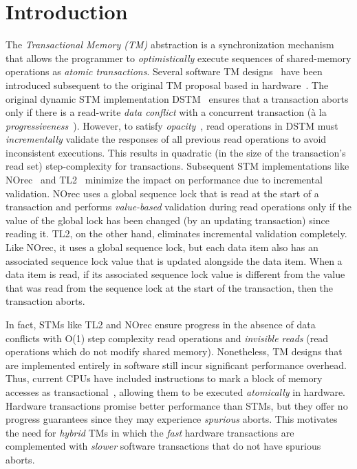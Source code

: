 \section{Introduction}
\label{sec:intro}
%
%
The \emph{Transactional Memory (TM)} abstraction is a synchronization mechanism 
that allows the programmer to \emph{optimistically} execute sequences of shared-memory
operations as \emph{atomic transactions}.
Several software TM designs~\cite{norec, ST95,HLM+03,fraser} have been introduced subsequent to the original TM proposal based in
hardware~\cite{HM93}. 
The original dynamic STM implementation DSTM~\cite{HLM+03} ensures that a transaction aborts only if there is a read-write \emph{data conflict} with a concurrent
transaction (\`a la \emph{progressiveness}~\cite{tm-book}). However, to satisfy \emph{opacity}~\cite{tm-book}, read operations in DSTM must \emph{incrementally} validate
the responses of all previous read operations to avoid inconsistent executions. 
This results in quadratic  (in the size of the transaction's read
set) step-complexity for transactions. Subsequent STM 
implementations like NOrec~\cite{norec} and TL2~\cite{DSS06}
minimize the impact on performance due to incremental validation.
NOrec uses a global sequence lock that is read at the start of a transaction and performs \emph{value-based}
validation during read operations only if the value of the global lock has been changed (by an updating transaction) 
since reading it.
TL2, on the other hand, eliminates incremental validation completely.
Like NOrec, it uses a global sequence lock, but each data item also 
has an associated sequence lock value that is updated alongside the data item.
When a data item is read, if its associated sequence lock value is different 
from the value that was read from the sequence lock at the start of the transaction, then the transaction aborts.

In fact, STMs like TL2 and NOrec ensure progress in the absence of data conflicts with 
O(1) step complexity read operations and \emph{invisible reads} (read operations which 
do not modify shared memory).
Nonetheless, TM designs that are implemented entirely in software still incur significant performance overhead.
Thus, current CPUs have included instructions to mark a block of memory accesses as transactional~\cite{Rei12, asf, bluegene}, allowing them to be executed \emph{atomically} in hardware.
Hardware transactions promise better performance than STMs, but they offer no progress guarantees 
since they may experience \emph{spurious} aborts. This motivates the need for
\emph{hybrid} TMs in which the \emph{fast} hardware transactions are 
complemented with \emph{slower} software transactions that do not have spurious aborts.

